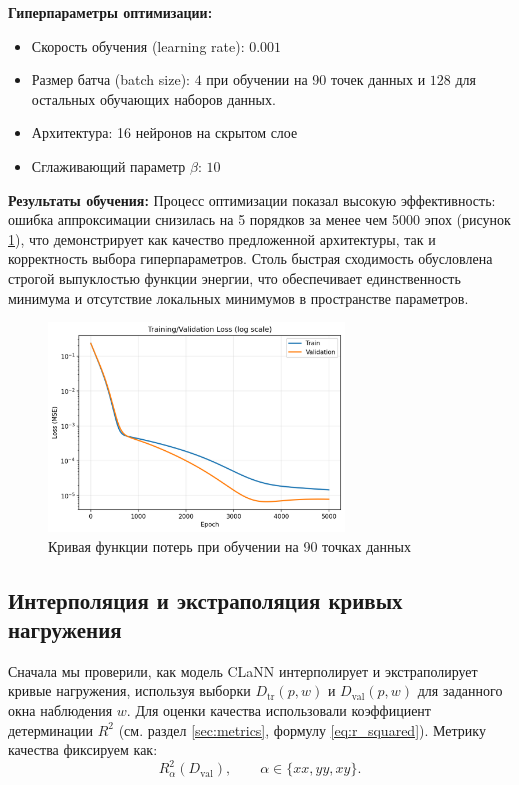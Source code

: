 \textbf{Гиперпараметры оптимизации:}
\begin{itemize}
  \item Скорость обучения (learning rate): $0.001$
  \item Размер батча (batch size): $4$ при обучении на 90 точек данных и $128$ для остальных обучающих наборов данных.
  \item Архитектура: 16 нейронов на скрытом слое
  \item Сглаживающий параметр $\beta$: $10$
\end{itemize}

\textbf{Результаты обучения:}
Процесс оптимизации показал высокую эффективность: ошибка аппроксимации снизилась на 5 порядков за менее чем 5000 эпох (рисунок \ref{fig:loss_curve}), 
что демонстрирует как качество предложенной архитектуры, так и корректность выбора гиперпараметров. 
Столь быстрая сходимость обусловлена строгой выпуклостью функции энергии, что обеспечивает единственность 
минимума и отсутствие локальных минимумов в пространстве параметров.

\begin{figure}[H]
  \centering
  \includegraphics[width=0.7\textwidth]{img/loss_curve.png}
  \caption{Кривая функции потерь при обучении на 90 точках данных}
  \label{fig:loss_curve}
\end{figure}


\subsection{Интерполяция и экстраполяция кривых нагружения}
  Сначала мы проверили, как модель CLaNN интерполирует и экстраполирует кривые нагружения, используя выборки
  $D_{\mathrm{tr}}(p,w)$ и $D_{\mathrm{val}}(p,w)$ для заданного окна наблюдения $w$.
  Для оценки качества использовали коэффициент детерминации $R^2$ (см. раздел \ref{sec:metrics}, формулу \eqref{eq:r_squared}). Метрику качества фиксируем как:
\[
  R^2_{\alpha}(D_{\mathrm{val}}),\qquad \alpha\in\{xx,yy,xy\}.
\]

